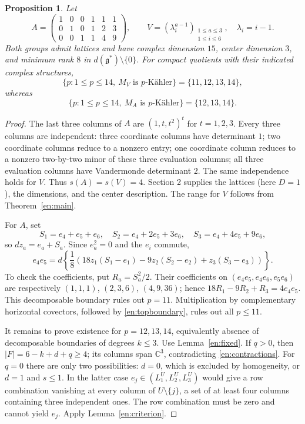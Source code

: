 \documentclass[12pt]{amsart}
\newtheorem{prop}[thm]{Proposition}
\theoremstyle{definition}
\theoremstyle{remark}
\numberwithin{equation}{section}
\newcommand{\C}{\mathbb{C}}
\newcommand{\gfr}{\mathfrak g}
\begin{document}
\begin{prop}\label{en:counter}
Let
\begin{equation}\label{en:counterA}
 A=\begin{pmatrix}
 1&0&0&1&1&1\\
 0&1&0&1&2&3\\
 0&0&1&1&4&9
 \end{pmatrix},\qquad
 V=(\lambda_i^{a-1})_{\substack{1\leq a\leq3\\1\leq i\leq6}},
 \quad\lambda_i=i-1.
\end{equation}
Both groups admit lattices and have complex dimension $15$, center
dimension $3$, and minimum rank $8$ in $d(\gfr^*)\setminus\{0\}$.
For compact quotients with their indicated complex structures,
\[
 \{p:1\leq p\leq14,\ M_V\text{ is }p\text{-K\"ahler}\}=\{11,12,13,14\},
\]
whereas
\[
 \{p:1\leq p\leq14,\ M_A\text{ is }p\text{-K\"ahler}\}=\{12,13,14\}.
\]
\end{prop}
\begin{proof}
The last three columns of $A$ are $(1,t,t^2)^t$ for $t=1,2,3$.
Every three columns are independent: three coordinate columns have
determinant $1$; two coordinate columns reduce to a nonzero entry;
one coordinate column reduces to a nonzero two-by-two minor of these
three evaluation columns; all three evaluation columns have Vandermonde
determinant $2$. The same independence holds for $V$. Thus $s(A)=s(V)=4$.
Section 2 supplies the lattices (here $D=1$), the dimensions, and the
center description. The range for $V$ follows from Theorem~\ref{en:main}.

For $A$, set
\[
 S_1=e_4+e_5+e_6,\quad S_2=e_4+2e_5+3e_6,\quad
 S_3=e_4+4e_5+9e_6,
\]
so $d z_a=e_a+S_a$. Since $e_a^2=0$ and the $e_i$ commute,
\begin{equation}\label{en:counterprimitive}
 e_4e_5=d\left\{\frac18\left(
 18z_1(S_1-e_1)-9z_2(S_2-e_2)+z_3(S_3-e_3)\right)\right\}.
\end{equation}
To check the coefficients, put $R_a=S_a^2/2$. Their coefficients on
$(e_4e_5,e_4e_6,e_5e_6)$ are respectively
$(1,1,1)$, $(2,3,6)$, $(4,9,36)$; hence
$18R_1-9R_2+R_3=4e_4e_5$.
This decomposable boundary rules out $p=11$. Multiplication by
complementary horizontal covectors, followed by
\eqref{en:topboundary}, rules out all $p\leq11$.

It remains to prove existence for $p=12,13,14$, equivalently absence of
decomposable boundaries of degrees $k\leq3$. Use Lemma~\ref{en:fixed}.
If $q>0$, then $|F|=6-k+d+q\geq4$; its columns span $\C^3$, contradicting
\eqref{en:contractions}. For $q=0$ there are only two possibilities:
$d=0$, which is excluded by homogeneity, or $d=1$ and $s\leq1$.
In the latter case $e_j\in(L_1^U,L_2^U,L_3^U)$ would give a row
combination vanishing at every column of $U\setminus\{j\}$, a set of
at least four columns containing three independent ones. The row
combination must be zero and cannot yield $e_j$.
Apply Lemma~\ref{en:criterion}.
\end{proof}
\end{document}
